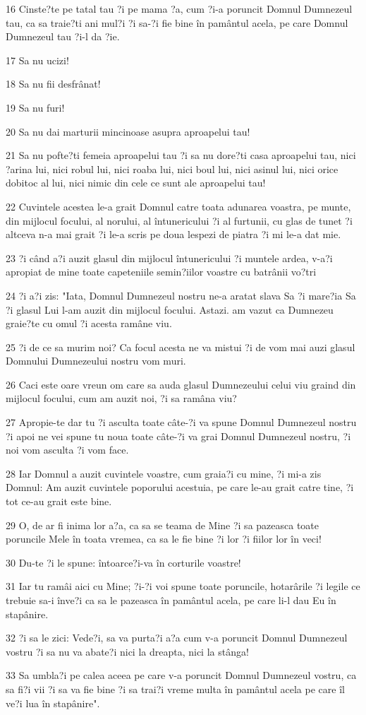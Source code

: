 \par 16 Cinste?te pe tatal tau ?i pe mama ?a, cum ?i-a poruncit Domnul Dumnezeul tau, ca sa traie?ti ani mul?i ?i sa-?i fie bine în pamântul acela, pe care Domnul Dumnezeul tau ?i-l da ?ie.
\par 17 Sa nu ucizi!
\par 18 Sa nu fii desfrânat!
\par 19 Sa nu furi!
\par 20 Sa nu dai marturii mincinoase asupra aproapelui tau!
\par 21 Sa nu pofte?ti femeia aproapelui tau ?i sa nu dore?ti casa aproapelui tau, nici ?arina lui, nici robul lui, nici roaba lui, nici boul lui, nici asinul lui, nici orice dobitoc al lui, nici nimic din cele ce sunt ale aproapelui tau!
\par 22 Cuvintele acestea le-a grait Domnul catre toata adunarea voastra, pe munte, din mijlocul focului, al norului, al întunericului ?i al furtunii, cu glas de tunet ?i altceva n-a mai grait ?i le-a scris pe doua lespezi de piatra ?i mi le-a dat mie.
\par 23 ?i când a?i auzit glasul din mijlocul întunericului ?i muntele ardea, v-a?i apropiat de mine toate capeteniile semin?iilor voastre cu batrânii vo?tri
\par 24 ?i a?i zis: "Iata, Domnul Dumnezeul nostru ne-a aratat slava Sa ?i mare?ia Sa ?i glasul Lui l-am auzit din mijlocul focului. Astazi. am vazut ca Dumnezeu graie?te cu omul ?i acesta ramâne viu.
\par 25 ?i de ce sa murim noi? Ca focul acesta ne va mistui ?i de vom mai auzi glasul Domnului Dumnezeului nostru vom muri.
\par 26 Caci este oare vreun om care sa auda glasul Dumnezeului celui viu graind din mijlocul focului, cum am auzit noi, ?i sa ramâna viu?
\par 27 Apropie-te dar tu ?i asculta toate câte-?i va spune Domnul Dumnezeul nostru ?i apoi ne vei spune tu noua toate câte-?i va grai Domnul Dumnezeul nostru, ?i noi vom asculta ?i vom face.
\par 28 Iar Domnul a auzit cuvintele voastre, cum graia?i cu mine, ?i mi-a zis Domnul: Am auzit cuvintele poporului acestuia, pe care le-au grait catre tine, ?i tot ce-au grait este bine.
\par 29 O, de ar fi inima lor a?a, ca sa se teama de Mine ?i sa pazeasca toate poruncile Mele în toata vremea, ca sa le fie bine ?i lor ?i fiilor lor în veci!
\par 30 Du-te ?i le spune: întoarce?i-va în corturile voastre!
\par 31 Iar tu ramâi aici cu Mine; ?i-?i voi spune toate poruncile, hotarârile ?i legile ce trebuie sa-i înve?i ca sa le pazeasca în pamântul acela, pe care li-l dau Eu în stapânire.
\par 32 ?i sa le zici: Vede?i, sa va purta?i a?a cum v-a poruncit Domnul Dumnezeul vostru ?i sa nu va abate?i nici la dreapta, nici la stânga!
\par 33 Sa umbla?i pe calea aceea pe care v-a poruncit Domnul Dumnezeul vostru, ca sa fi?i vii ?i sa va fie bine ?i sa trai?i vreme multa în pamântul acela pe care îl ve?i lua în stapânire".

